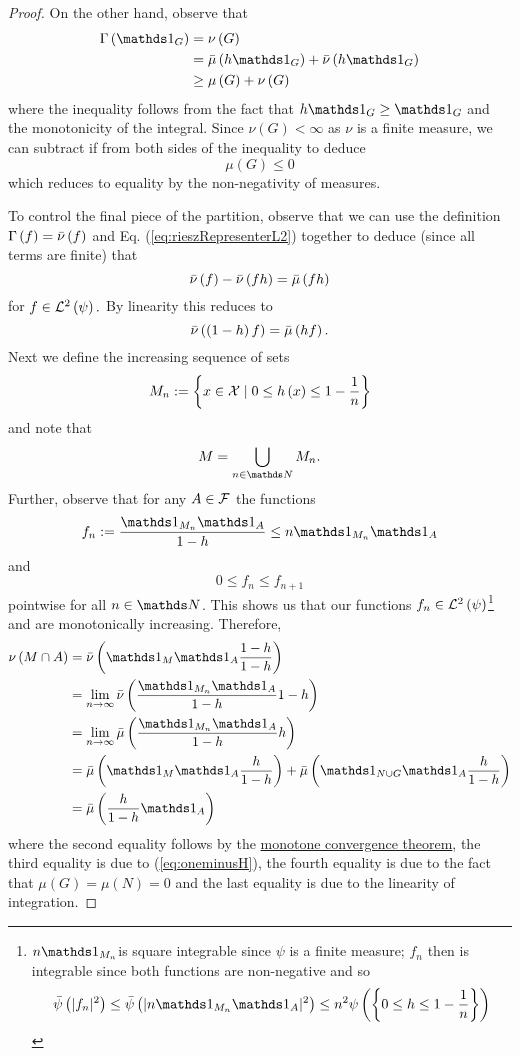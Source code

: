 \begin{proof}
On the other hand, observe that 
\begin{align*}
\Gamma\left(\indicate_{G}\right) & =\nu\left(G\right)\\
 & =\lebInt{\mu}{h\indicate_{G}}+\lebInt{\nu}{h\indicate_{G}}\\
 & \geq\mu\left(G\right)+\nu\left(G\right)
\end{align*}
where the inequality follows from the fact that $h\indicate_{G}\geq\indicate_{G}$
and the monotonicity of the integral. Since $\nu\left(G\right)<\infty$
as $\nu$ is a finite measure, we can subtract if from both sides
of the inequality to deduce
\[
\mu\left(G\right)\leq0
\]
 which reduces to equality by the non-negativity of measures.

To control the final piece of the partition, observe that we can use
the definition $\Gamma\left(f\right)=\bar{\nu}\left(f\right)$ and Eq. (\ref{eq:rieszRepresenterL2})
together to deduce (since all terms are finite) that
\[
\bar{\nu}\left(f\right)-\bar{\nu}\left(fh\right)=\bar{\mu}\left(fh\right)
\]
for $f\in\mathcal{L}^{2}\left(\psi\right).$ By linearity this reduces to~
\begin{equation}
\bar{\nu}\left(\left(1-h\right)f\right)=\bar{\mu}\left(hf\right).\label{eq:oneminusH}
\end{equation}
Next we define the increasing sequence of sets
\[
M_{n}:=\left\{ x\in\mathcal{X}\mid0\leq h\left(x\right)\leq1-\frac{1}{n}\right\} 
\]
and note that
\[
M=\bigcup_{n\in\N}M_{n}.
\]
Further, observe that for any $A\in\mathcal{F}$ the functions
\[
f_{n}:=\frac{\indicate_{M_{n}}\indicate_{A}}{1-h}\leq n\indicate_{M_{n}}\indicate_{A}
\]
and
\[
0\leq f_{n}\leq f_{n+1}
\]
pointwise for all $n\in\N$. This shows us that our functions $f_{n}\in\mathcal{L}^{2}\left(\psi\right)$\footnote{$n\indicate_{M_{n}}$is square integrable since $\psi$ is a finite
measure; $f_{n}$ then is integrable since both functions are non-negative
and so 
\[
\lebInt{\psi}{\lvert f_{n}\rvert^{2}}\leq\lebInt{\psi}{\lvert n\indicate_{M_{n}}\indicate_{A}\rvert^{2}}\leq n^{2}\psi\left(\left\{ 0\leq h\leq1-\frac{1}{n}\right\} \right)
\]
} and are monotonically increasing. Therefore,
\begin{align*}
\nu\left(M\cap A\right) & =\lebInt{\nu}{\indicate_{M}\indicate_{A}\frac{1-h}{1-h}}\\
 & =\lim_{n\to\infty}\lebInt{\nu}{\frac{\indicate_{M_{n}}\indicate_{A}}{1-h}1-h}\\
 & =\lim_{n\to\infty}\lebInt{\mu}{\frac{\indicate_{M_{n}}\indicate_{A}}{1-h}h}\\
 & =\lebInt{\mu}{\indicate_{M}\indicate_{A}\frac{h}{1-h}}+\lebInt{\mu}{\indicate_{N\cup G}\indicate_{A}\frac{h}{1-h}}\\
 & =\lebInt{\mu}{\frac{h}{1-h}\indicate_{A}}
\end{align*}
where the second equality follows by the \hyperref[thm:generalizedMonotoneConvergence]{monotone convergence theorem},
the third equality is due to (\ref{eq:oneminusH}), the fourth equality
is due to the fact that $\mu\left(G\right)=\mu\left(N\right)=0$ and
the last equality is due to the linearity of integration. 


\end{proof}
